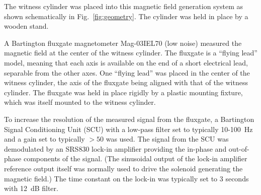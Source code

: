 The witness cylinder was placed into this magnetic field generation
system as shown schematically in Fig.~\ref{fig:geometry}.  The
cylinder was held in place by a wooden stand.



A Bartington fluxgate magnetometer Mag-03IEL70 (low noise) measured
the magnetic field at the center of the witness cylinder.  The
fluxgate is a ``flying lead'' model, meaning that each axis is
available on the end of a short electrical lead, separable from the
other axes.  One ``flying lead'' was placed in the center of the
witness cylinder, the axis of the fluxgate being aligned with that of
the witness cylinder.  The fluxgate was held in place rigidly by a
plastic mounting fixture, which was itself mounted to the witness
cylinder.


To increase the resolution of the measured signal from the fluxgate, a
Bartington Signal Conditioning Unit (SCU) with a low-pass filter set
to typically 10-100~Hz and a gain set to typically $>50$ was used.
The signal from the SCU was demodulated by an SRS830 lock-in amplifier
providing the in-phase and out-of-phase components of the signal.
(The sinusoidal output of the lock-in amplifier reference output
itself was normally used to drive the solenoid generating the magnetic
field.)  The time constant on the lock-in was typically set to 3
seconds with 12~dB filter.

